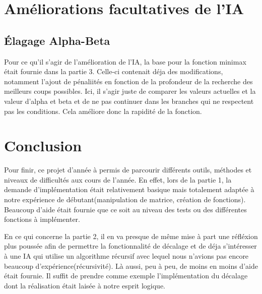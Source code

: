 \documentclass[utf8]{article}
\begin{document}
\section {Améliorations facultatives de l’IA}
\subsection{Élagage Alpha-Beta}

\qquad Pour ce qu'il s'agir de l'amélioration de l'IA, la base pour la fonction minimax était fournie dans la partie 3. Celle-ci contenait déja des modifications, notamment l'ajout de pénaliités en fonction de la profondeur de la recherche des meilleurs coups possibles. Ici, il s'agir juste de comparer les valeurs actuelles et la valeur d'alpha et beta et de ne pas continuer dans les branches qui ne respectent pas les conditions. Cela améliore donc la rapidité de la fonction.

\begin{figure}[H]
\begin{minipage}{\textwidth}
  \centering
	
  \label{fig:code_exemple}
\end{minipage}
\end{figure}


\newpage
\section{Conclusion}

\qquad Pour finir, ce projet d'année à permis de parcourir différents outils, méthodes et niveaux de difficultés aux cours de l'année.
En effet, lors de la partie 1, la demande d'implémentation était relativement basique mais totalement adaptée à notre expérience de débutant(manipulation de matrice, création de fonctions). Beaucoup d'aide était fournie que ce soit au niveau des tests ou des différentes fonctions à implémenter.

\qquad En ce qui concerne la partie 2, il en va presque de même mise à part une réfléxion plus poussée afin de permettre la fonctionnalité de décalage et de déja s'intéresser à une IA qui utilise
un algorithme récursif avec lequel nous n'avions pas encore beaucoup d'expérience(récursivité). Là aussi, peu à peu, de moins en moins d'aide était fournie. Il suffit de prendre comme exemple l'implémentation du décalage dont la réalisation était laisée à notre esprit logique.
\end{document}
